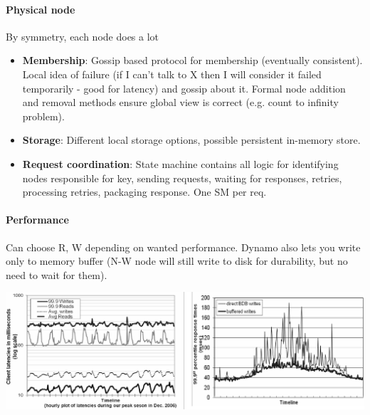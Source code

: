 \paragraph{Physical node} By symmetry, each node does a lot
\begin{itemize}
  \item \textbf{Membership}: Gossip based protocol for membership (eventually
    consistent). Local idea of failure (if I can't talk to X then I will
    consider it failed temporarily - good for latency) and gossip about it.
    Formal node addition and removal methods ensure global view is correct
    (e.g. count to infinity problem).
  \item \textbf{Storage}: Different local storage options, possible persistent
    in-memory store.
  \item \textbf{Request coordination}: State machine contains all logic for
    identifying nodes responsible for key, sending requests, waiting for
    responses, retries, processing retries, packaging response. One SM per req.
\end{itemize}

\paragraph{Performance} Can choose R, W depending on wanted performance. Dynamo
also lets you write only to memory buffer (N-W node will still write to disk for
durability, but no need to wait for them).

\includegraphics[width=0.98\linewidth]{img/dyn-perf.png}

